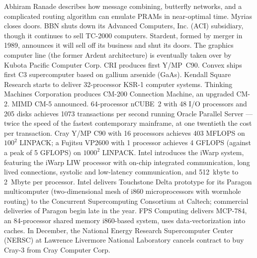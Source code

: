 	{Abhiram Ranade describes how message combining,
	butterfly networks,
	and a complicated routing algorithm
	can emulate PRAMs in near-optimal time.}
	{Myrias closes doors.}
	{BBN shuts down its Advanced Computers, Inc. (ACI) subsidiary,
	though it continues to sell TC-2000 computers.}
	{Stardent, formed by merger in 1989, announces it will sell off
	its business and shut its doors.
	The graphics computer line (the former Ardent architecture)
	is eventually taken over by Kubota Pacific Computer Corp.}
	{CRI produces first Y/MP~C90.}
	{Convex ships first C3 supercomputer based on gallium arsenide
	(GaAs).}
	{Kendall Square Research starts to deliver 32-processor
	KSR-1 computer systems.}
	{Thinking Machines Corporation produces CM-200 Connection Machine,
	an upgraded CM-2.
	MIMD CM-5 announced.}
	{64-processor nCUBE~2 with 48 I/O processors and 205 disks
	achieves 1073 transactions per second running
	Oracle Parallel Server ---
	twice the speed of the fastest contemporary mainframe,
	at one twentieth the cost per transaction.}
	{Cray Y/MP C90 with 16 processors achieves 403 MFLOPS
	on $100^2$ LINPACK;
	a Fujitsu VP2600 with 1 processor achieves 4 GFLOPS
	(against a peak of 5 GFLOPS)
	on $1000^2$ LINPACK.}
	{Intel introduces the iWarp system,
	featuring the iWarp LIW processor with
	on-chip integrated communication,
	long lived connections,	systolic and low-latency communication,
	and 512~kbyte to 2~Mbyte per processor.}
	{Intel delivers Touchstone Delta prototype
	for its Paragon multicomputer
	(two-dimensional mesh of i860 microprocessors
	with wormhole routing)
	to the Concurrent Supercomputing Consortium at Caltech;
	commercial deliveries of Paragon begin late in the year.}
        {FPS Computing delivers MCP-784,
	an 84-processor shared memory i860-based system,
        uses data-vectorization into caches.}
	{In December,
	the National Energy Research Supercomputer Center (NERSC)
	at Lawrence Livermore National Laboratory
	cancels contract to buy Cray-3 from Cray Computer Corp.}
